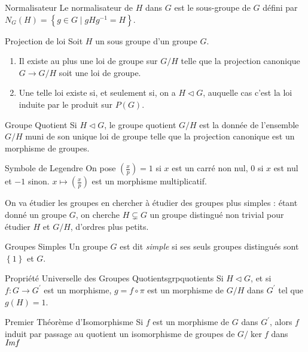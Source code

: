 \documentclass{cours}
\begin{document}
\begin{définition}{Normalisateur}{}
    Le normalisateur de $H$ dans $G$ est le sous-groupe de $G$ défini par $N_{G}(H) = \left\{g \in G \mid gHg^{-1} = H\right\}$.
\end{définition}

\begin{théorème}{Projection de loi}{}
    Soit $H$ un sous groupe d'un groupe $G$.
    \begin{enumerate}
        \item Il existe au plus une loi de groupe sur $G/H$ telle que la projection canonique $G \rightarrow G/H$ soit une loi de groupe.
        \item Une telle loi existe si, et seulement si, on a $H \lhd G$, auquelle cas c'est la loi induite par le produit sur $P(G)$.
    \end{enumerate}
\end{théorème}

\begin{définition}{Groupe Quotient}{}
    Si $H \lhd G$, le groupe quotient $G/H$ est la donnée de l'ensemble $G/H$ muni de son unique loi de groupe telle que la projection canonique est un morphisme de groupes.
\end{définition}

\begin{définition}{Symbole de Legendre}{}
    On pose $\left(\frac{x}{p}\right) = 1$ si $x$ est un carré non nul, $0$ si $x$ est nul et $-1$ sinon. $x \mapsto \left(\frac{x}{p}\right)$ est un morphisme multiplicatif.
\end{définition}

On va étudier les groupes en chercher à étudier des groupes plus simples : étant donné un groupe $G$, on cherche $H \subsetneq G$ un groupe distingué non trivial pour étudier $H$ et $G/H$, d'ordres plus petits.
\begin{définition}{Groupes Simples}{}
    Un groupe $G$ est dit \emph{simple} si ses seuls groupes distingués sont $\left\{1\right\}$ et $G$.
\end{définition}

\begin{théorème}{Propriété Universelle des Groupes Quotients}{grpquotients}
    Si $H \lhd G$, et si $f : G \rightarrow G^{'}$ est un morphisme, $g = f \circ \pi$ est un morphisme de $G/H$ dans $G^{'}$ tel que $g(H) = {1}$.
\end{théorème}

\begin{théorème}{Premier Théorème d'Isomorphisme}{}
    Si $f$ est un morphisme de $G$ dans $G^{'}$, alors $f$ induit par passage au quotient un isomorphisme de groupes de $G/\ker f$ dans $\emph{Im} f$
\end{théorème}
\end{document}
